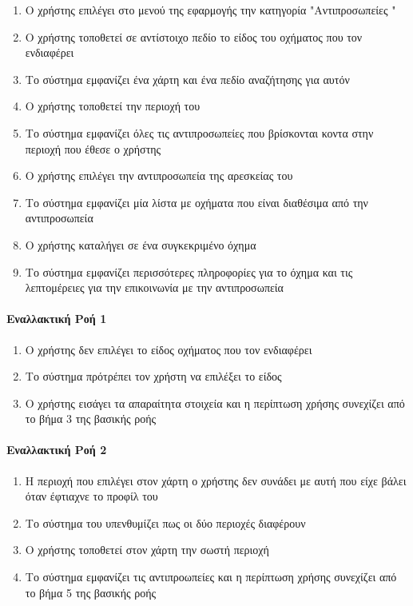 \documentclass{../ol-softwaremanual}
\begin{document}
    \begin{enumerate}
    	\item Ο χρήστης επιλέγει στο μενού της εφαρμογής την κατηγορία \en"\gr Αντιπροσωπείες \en"\gr
    	\item Ο χρήστης τοποθετεί σε αντίστοιχο πεδίο το είδος του οχήματος που τον ενδιαφέρει
    	\item Το σύστημα εμφανίζει ένα χάρτη και ένα πεδίο αναζήτησης για αυτόν
    	\item Ο χρήστης τοποθετεί την περιοχή του  
    	\item Το σύστημα εμφανίζει όλες τις αντιπροσωπείες που βρίσκονται κοντα στην περιοχή που έθεσε ο χρήστης
    	\item Ο χρήστης επιλέγει την αντιπροσωπεία της αρεσκείας του
    	\item Το σύστημα εμφανίζει μία λίστα με οχήματα που είναι διαθέσιμα από την αντιπροσωπεία 
    	\item Ο χρήστης καταλήγει σε ένα συγκεκριμένο όχημα
    	\item Το σύστημα εμφανίζει περισσότερες πληροφορίες για το όχημα και τις λεπτομέρειες για την επικοινωνία με την αντιπροσωπεία
    	
    \end{enumerate}
    
    \paragraph{Εναλλακτική Ροή 1}
    
    \begin{enumerate}
    	\item Ο χρήστης δεν επιλέγει το είδος οχήματος που τον ενδιαφέρει
    	\item Το σύστημα πρότρέπει τον χρήστη να επιλέξει το είδος
    	\item Ο χρήστης εισάγει τα απαραίτητα στοιχεία και η περίπτωση χρήσης συνεχίζει από το βήμα 3 της βασικής ροής
    \end{enumerate}

    \paragraph{Εναλλακτική Ροή 2}
    
    \begin{enumerate}
    	\item Η περιοχή που επιλέγει στον χάρτη ο χρήστης δεν συνάδει με αυτή που είχε βάλει όταν έφτιαχνε το προφίλ του
    	\item Το σύστημα του υπενθυμίζει πως οι δύο περιοχές διαφέρουν
    	\item Ο χρήστης τοποθετεί στον χάρτη την σωστή περιοχή
    	\item  Το σύστημα εμφανίζει τις αντιπροωπείες και η περίπτωση χρήσης συνεχίζει από το βήμα 5 της βασικής ροής
    \end{enumerate}
\end{document}

